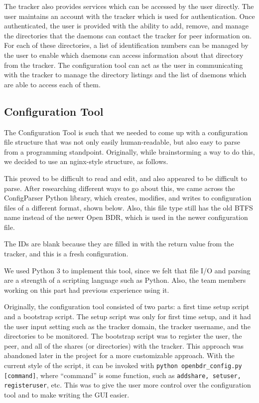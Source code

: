 \documentclass[12 pt]{article}
\begin{document}
	The tracker also provides services which can be accessed by the user directly. The user maintains an account with the tracker which is used for authentication. Once authenticated, the user is provided with the ability to add, remove, and manage the directories that the daemons can contact the tracker for peer information on. For each of these directories, a list of identification numbers can be managed by the user to enable which daemons can access information about that directory from the tracker. The configuration tool can act as the user in communicating with the tracker to manage the directory listings and the list of daemons which are able to access each of them.
	
	\subsection{Configuration Tool}
	
	The Configuration Tool is such that we needed to come up with a configuration file structure that was not only easily human-readable, but also easy to parse from a programming standpoint. Originally, while brainstorming a way to do this, we decided to use an nginx-style structure, as follows.
	
	
	
	This proved to be difficult to read and edit, and also appeared to be difficult to parse. After researching different ways to go about this, we came across the ConfigParser Python library, which creates, modifies, and writes to configuration files of a different format, shown below. Also, this file type still has the old BTFS name instead of the newer Open BDR, which is used in the newer configuration file.
	
	
	
	The IDs are blank because they are filled in with the return value from the tracker, and this is a fresh configuration. 
	
	We used Python 3 to implement this tool, since we felt that file I/O and parsing are a strength of a scripting language such as Python. Also, the team members working on this part had previous experience using it.
	
	Originally, the configuration tool consisted of two parts: a first time setup script and a bootstrap script. The setup script was only for first time setup, and it had the user input setting such as the tracker domain, the tracker username, and the directories to be monitored. The bootstrap script was to register the user, the peer, and all of the shares (or directories) with the tracker. This approach was abandoned later in the project for a more customizable approach. With the current style of the script, it can be invoked with \texttt{python openbdr\_config.py [command]}, where ``command'' is some function, such as \texttt{addshare, setuser, registeruser}, etc. This was to give the user more control over the configuration tool and to make writing the GUI easier.
	
\end{document}
